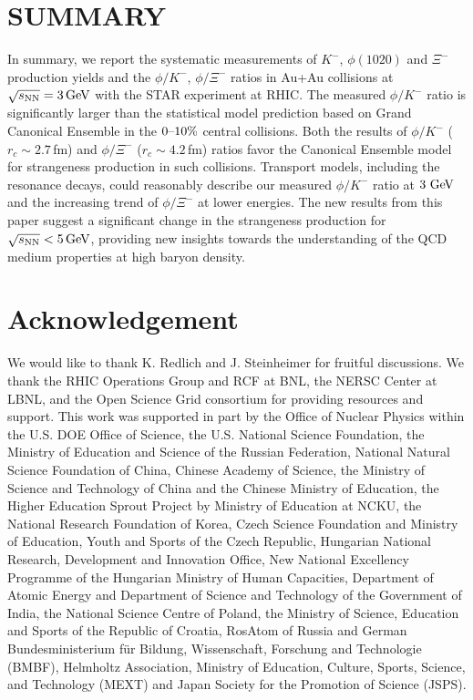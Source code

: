 \documentclass[aps,tightenlines,superscriptaddress,twocolumn]{revtex4-1}
\begin{document}
\section{SUMMARY}
\label{summary}

In summary, we report the systematic measurements of $K^-$, $\phi(1020)$ and $\Xi^{-}$ production yields and the $\phi/K^-$, $\phi/\Xi^-$ ratios in Au+Au collisions at ${\sqrt{s_{\rm NN}} = \rm{3\,GeV}}$ with the STAR experiment at RHIC. The measured $\phi/K^-$ ratio is significantly larger than the statistical model prediction based on Grand Canonical Ensemble in the $\textup{0--10\%}$ central collisions. Both the results of $\phi/K^-$ ($r_c \sim 2.7$\,fm) and $\phi/\Xi^-$ ($r_c \sim 4.2$\,fm) ratios favor the Canonical Ensemble model for strangeness production in such collisions. Transport models, including the resonance decays, could reasonably describe our measured $\phi/K^-$ ratio at $\textup{3 GeV}$ and the increasing trend of $\phi/\Xi^-$ at lower energies. 
The new results from this paper suggest a significant change in the strangeness production for ${\sqrt{s_{\rm NN}} < \rm{5\,GeV}}$, providing new insights towards the understanding of the QCD medium properties at high baryon density. 


\section{Acknowledgement}
\label{acknowledgement}

We would like to thank K. Redlich and J. Steinheimer for fruitful discussions.
We thank the RHIC Operations Group and RCF at BNL, the NERSC Center at LBNL, and the Open Science Grid consortium for providing resources and support.  This work was supported in part by the Office of Nuclear Physics within the U.S. DOE Office of Science, the U.S. National Science Foundation, the Ministry of Education and Science of the Russian Federation, National Natural Science Foundation of China, Chinese Academy of Science, the Ministry of Science and Technology of China and the Chinese Ministry of Education, the Higher Education Sprout Project by Ministry of Education at NCKU, the National Research Foundation of Korea, Czech Science Foundation and Ministry of Education, Youth and Sports of the Czech Republic, Hungarian National Research, Development and Innovation Office, New National Excellency Programme of the Hungarian Ministry of Human Capacities, Department of Atomic Energy and Department of Science and Technology of the Government of India, the National Science Centre of Poland, the Ministry  of Science, Education and Sports of the Republic of Croatia, RosAtom of Russia and German Bundesministerium f\"ur Bildung, Wissenschaft, Forschung and Technologie (BMBF), Helmholtz Association, Ministry of Education, Culture, Sports, Science, and Technology (MEXT) and Japan Society for the Promotion of Science (JSPS).


\end{document}
